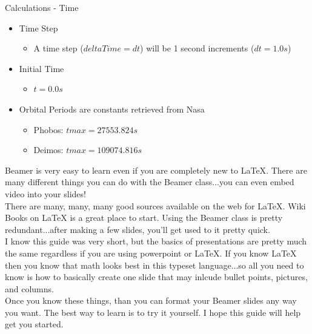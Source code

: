 \documentclass{beamer}  %
\begin{document}
\begin{frame}{Calculations - Time}

\begin{itemize}
	\item Time Step
	\begin{itemize}
		\item A time step ($deltaTime = dt$) will be 1 second increments ($dt = 1.0s$)
	\end{itemize}
	\item Initial Time
	\begin{itemize}
		\item $t = 0.0s$
	\end{itemize}
	\item Orbital Periods are constants retrieved from Nasa
	\begin{itemize}
		\item Phobos: $tmax = 27553.824s$
		\item Deimos: $tmax = 109074.816s$
	\end{itemize}
\end{itemize}

\end{frame}

\begin{frame}{}
Beamer is very easy to learn even if you are completely new to {\LaTeX}.  There are many different things you can do
with the Beamer class...you can even embed video into your slides!\\[0.2cm]

There are many, many, many good sources available on the web for {\LaTeX}.  Wiki Books on {\LaTeX} is a great place to start.  Using the Beamer class is pretty redundant...after making a few slides, you'll get used to it pretty 
quick.\\[0.2cm]

I know this guide was very short, but the basics of presentations are pretty much the same regardless if you are using powerpoint or {\LaTeX}.  If you know {\LaTeX} then you know that math looks best in this typeset language...so all you need to know is how to basically create one slide that may inlcude bullet points, pictures, and columns. \\[0.2cm]

Once you know these things, than you can format your Beamer slides any way you want.  The best way to learn is to try
it yourself.  I hope this guide will help get you started.

\end{frame}
\end{document}
